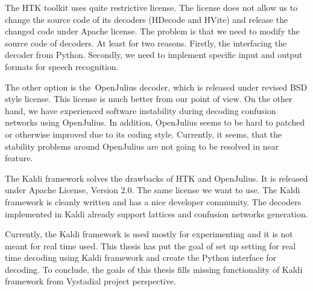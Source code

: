 The HTK toolkit uses quite restrictive license. The license does not allow us to change the source code of its decoders (HDecode and HVite) and release the changed code under Apache license. The problem is that we need to modify the source code of decoders. At least for two reasons. Firstly, the interfacing the decoder from Python. Secondly, we need to implement specific input and output formats for speech recognition.

The other option is the~OpenJulius decoder, which is released under revised BSD style license. This license is much better from our point of view. On the other hand, we have experienced software instability during decoding confusion networks using OpenJulius. In addition, OpenJulius seems to be hard to patched or otherwise improved due to its coding style. Currently, it seems, that the stability problems around OpenJulius are not going to be resolved in near feature.

The Kaldi framework solves the drawbacks of HTK and OpenJulius. It is released under Apache License, Version 2.0. The same license we want to use. The Kaldi framework is cleanly written and has a nice developer community.
The decoders implemented in Kaldi already support lattices and confusion networks generation. 


Currently, the Kaldi framework is used mostly for experimenting and it is not meant for real time used.
This thesis has put the goal of set up setting for real time decoding using Kaldi framework and create the Python interface for decoding. To conclude, the goals of this thesis fills missing functionality of Kaldi framework from Vystadial project perspective. 





